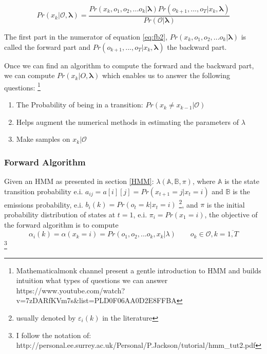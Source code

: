 \documentclass[a4paper,12pt]{article}
\theoremstyle{definition}
\begin{document}
\begin{equation}\label{eq:fb2}
Pr(x_k | \mathcal{O}, \mathbf{\lambda}) = \frac{Pr(x_k,o_1,o_2,...o_k |\mathbf{\lambda} ) Pr(o_{k+1},...,o_T|x_k,\mathbf{\lambda})}{Pr(\mathcal{O}|\mathbf{\lambda})}
\end{equation}

The first part in the numerator of equation \ref{eq:fb2}, $Pr (x_k,o_1,o_2,...o_k |\mathbf{\lambda} )$ is called the forward part and $Pr(o_{k+1},...,o_T|x_k,\mathbf{\lambda})$ the backward part. 

Once we can find an algorithm to compute the forward and the backward part, we can compute $Pr(x_k | O, \mathbf{\lambda})$ which enables us to answer the following questions: \footnote{Mathematicalmonk channel present a gentle introduction to HMM and builds intuition what types of questions we can answer https://www.youtube.com/watch?v=7zDARfKVm7s\&list=PLD0F06AA0D2E8FFBA}

\begin{enumerate}
\item The Probability of being in a transition: $Pr(x_k \not= x_{k-1}|\mathcal{O})$
\item Helps augment the numerical methods in estimating the parameters of $\lambda$
\item Make samples on $x_k|\mathcal{O}$
\end{enumerate}




\subsubsection{Forward Algorithm}\label{sec:fa}
Given an HMM as presented in section \ref{HMM}: $\lambda(\mathbb{A}, \mathbb{B}, \pi)$, where $\mathbb{A}$ is the state transition probability e.i. $a_{ij}=a[i][j]=Pr(x_{t+1}=j|x_t=i)$  and $\mathbb{B}$ is the emissions probability, e.i. $b_i(k) = Pr(o_t = k|x_t=i)$ \footnote{ usually denoted by $\varepsilon_i(k)$ in the literature}, and $\pi$ is the initial probability distribution of states at $t=1$, e.i. $\pi_i = Pr(x_1=i)$, the objective of the forward algorithm is to compute
\begin{equation}\label{eq:fwa}
\alpha_i(k)=\alpha\left( x_k=i \right) = Pr(o_1,o_2,...o_k,x_k | \lambda) \quad\quad o_k \in \mathcal{O}, k=\overline{1,T} 
\end{equation}\footnote{I follow the notation of: http://personal.ee.surrey.ac.uk/Personal/P.Jackson/tutorial/hmm\_tut2.pdf}
\end{document}
